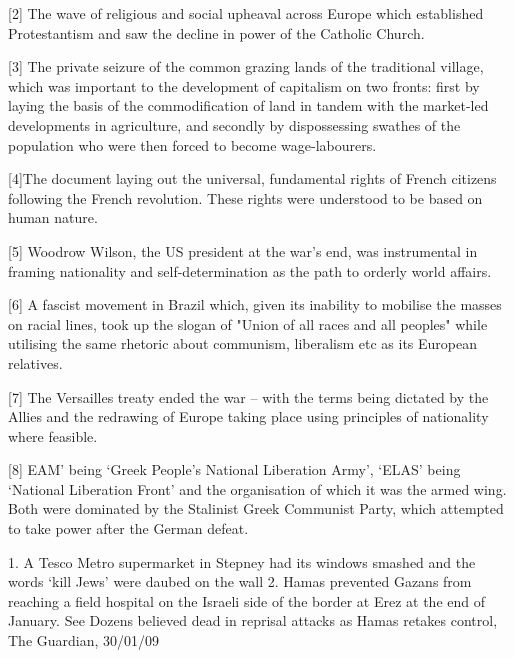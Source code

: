 [2] The wave of religious and social upheaval across Europe which established Protestantism and saw the decline in power of the Catholic Church.

[3] The private seizure of the common grazing lands of the traditional village, which was important to the development of capitalism on two fronts: first by laying the basis of the commodification of land in tandem with the market-led developments in agriculture, and secondly by dispossessing swathes of the population who were then forced to become wage-labourers.

[4]The document laying out the universal, fundamental rights of French citizens following the French revolution.
These rights were understood to be based on human nature.

[5] Woodrow Wilson, the US president at the war’s end, was instrumental in framing nationality and self-determination as the path to orderly world affairs.

[6] A fascist movement in Brazil which, given its inability to mobilise the masses on racial lines, took up the slogan of "Union of all races and all peoples" while utilising the same rhetoric about communism, liberalism etc as its European relatives.

[7] The Versailles treaty ended the war – with the terms being dictated by the Allies and the redrawing of Europe taking place using principles of nationality where feasible.

[8] EAM’ being ‘Greek People’s National Liberation Army’, ‘ELAS’ being ‘National Liberation Front’ and the organisation of which it was the armed wing.
Both were dominated by the Stalinist Greek Communist Party, which attempted to take power after the German defeat.

    1.
	A Tesco Metro supermarket in Stepney had its windows smashed and the words ‘kill Jews’ were daubed on the wall
    2.
	Hamas prevented Gazans from reaching a field hospital on the Israeli side of the border at Erez at the end of January.
	See Dozens believed dead in reprisal attacks as Hamas retakes control, The Guardian, 30/01/09 
